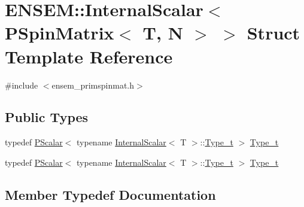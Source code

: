 \hypertarget{structENSEM_1_1InternalScalar_3_01PSpinMatrix_3_01T_00_01N_01_4_01_4}{}\section{E\+N\+S\+EM\+:\+:Internal\+Scalar$<$ P\+Spin\+Matrix$<$ T, N $>$ $>$ Struct Template Reference}
\label{structENSEM_1_1InternalScalar_3_01PSpinMatrix_3_01T_00_01N_01_4_01_4}


{\ttfamily \#include $<$ensem\+\_\+primspinmat.\+h$>$}

\subsection*{Public Types}
\begin{DoxyCompactItemize}
\item 
typedef \mbox{\hyperlink{classENSEM_1_1PScalar}{P\+Scalar}}$<$ typename \mbox{\hyperlink{structENSEM_1_1InternalScalar}{Internal\+Scalar}}$<$ T $>$\+::\mbox{\hyperlink{structENSEM_1_1InternalScalar_3_01PSpinMatrix_3_01T_00_01N_01_4_01_4_acfe33659fffa5fb364eb7d27a1fda7db}{Type\+\_\+t}} $>$ \mbox{\hyperlink{structENSEM_1_1InternalScalar_3_01PSpinMatrix_3_01T_00_01N_01_4_01_4_acfe33659fffa5fb364eb7d27a1fda7db}{Type\+\_\+t}}
\item 
typedef \mbox{\hyperlink{classENSEM_1_1PScalar}{P\+Scalar}}$<$ typename \mbox{\hyperlink{structENSEM_1_1InternalScalar}{Internal\+Scalar}}$<$ T $>$\+::\mbox{\hyperlink{structENSEM_1_1InternalScalar_3_01PSpinMatrix_3_01T_00_01N_01_4_01_4_acfe33659fffa5fb364eb7d27a1fda7db}{Type\+\_\+t}} $>$ \mbox{\hyperlink{structENSEM_1_1InternalScalar_3_01PSpinMatrix_3_01T_00_01N_01_4_01_4_acfe33659fffa5fb364eb7d27a1fda7db}{Type\+\_\+t}}
\end{DoxyCompactItemize}


\subsection{Member Typedef Documentation}
\mbox{\label{structENSEM_1_1InternalScalar_3_01PSpinMatrix_3_01T_00_01N_01_4_01_4_acfe33659fffa5fb364eb7d27a1fda7db}} 
